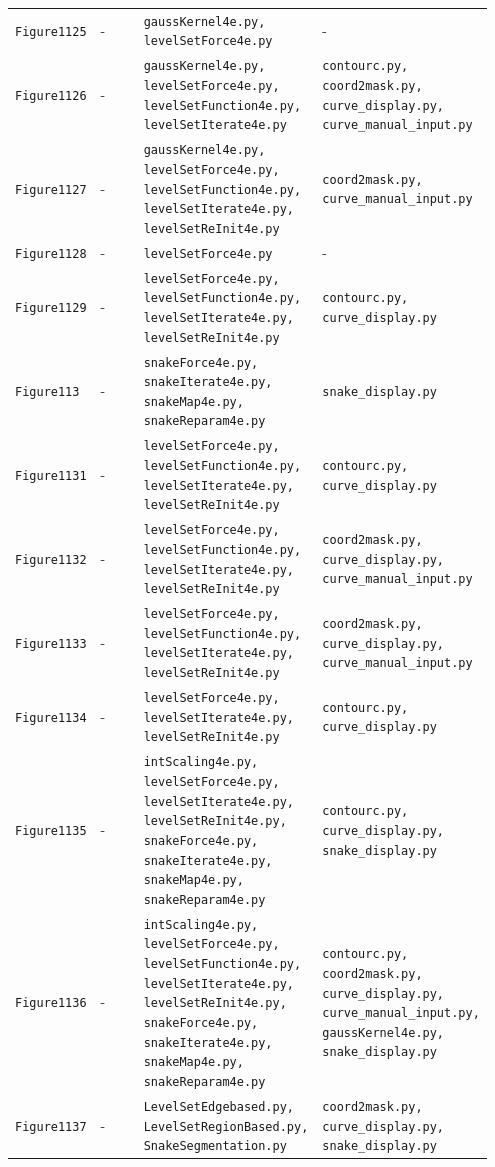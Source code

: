 \documentclass[10pt]{article}
\begin{document}
\begin{longtable}{p{0.11\linewidth} p{0.28\linewidth} p{0.28\linewidth} p{0.28\linewidth}}
\texttt{Figure1125} & - & \texttt{gaussKernel4e.py, levelSetForce4e.py} & - \\
\texttt{Figure1126} & - & \texttt{gaussKernel4e.py, levelSetForce4e.py, levelSetFunction4e.py, levelSetIterate4e.py} & \texttt{contourc.py, coord2mask.py, curve\_display.py, curve\_manual\_input.py} \\
\texttt{Figure1127} & - & \texttt{gaussKernel4e.py, levelSetForce4e.py, levelSetFunction4e.py, levelSetIterate4e.py, levelSetReInit4e.py} & \texttt{coord2mask.py, curve\_manual\_input.py} \\
\texttt{Figure1128} & - & \texttt{levelSetForce4e.py} & - \\
\texttt{Figure1129} & - & \texttt{levelSetForce4e.py, levelSetFunction4e.py, levelSetIterate4e.py, levelSetReInit4e.py} & \texttt{contourc.py, curve\_display.py} \\
\texttt{Figure113} & - & \texttt{snakeForce4e.py, snakeIterate4e.py, snakeMap4e.py, snakeReparam4e.py} & \texttt{snake\_display.py} \\
\texttt{Figure1131} & - & \texttt{levelSetForce4e.py, levelSetFunction4e.py, levelSetIterate4e.py, levelSetReInit4e.py} & \texttt{contourc.py, curve\_display.py} \\
\texttt{Figure1132} & - & \texttt{levelSetForce4e.py, levelSetFunction4e.py, levelSetIterate4e.py, levelSetReInit4e.py} & \texttt{coord2mask.py, curve\_display.py, curve\_manual\_input.py} \\
\texttt{Figure1133} & - & \texttt{levelSetForce4e.py, levelSetFunction4e.py, levelSetIterate4e.py, levelSetReInit4e.py} & \texttt{coord2mask.py, curve\_display.py, curve\_manual\_input.py} \\
\texttt{Figure1134} & - & \texttt{levelSetForce4e.py, levelSetIterate4e.py, levelSetReInit4e.py} & \texttt{contourc.py, curve\_display.py} \\
\texttt{Figure1135} & - & \texttt{intScaling4e.py, levelSetForce4e.py, levelSetIterate4e.py, levelSetReInit4e.py, snakeForce4e.py, snakeIterate4e.py, snakeMap4e.py, snakeReparam4e.py} & \texttt{contourc.py, curve\_display.py, snake\_display.py} \\
\texttt{Figure1136} & - & \texttt{intScaling4e.py, levelSetForce4e.py, levelSetFunction4e.py, levelSetIterate4e.py, levelSetReInit4e.py, snakeForce4e.py, snakeIterate4e.py, snakeMap4e.py, snakeReparam4e.py} & \texttt{contourc.py, coord2mask.py, curve\_display.py, curve\_manual\_input.py, gaussKernel4e.py, snake\_display.py} \\
\texttt{Figure1137} & - & \texttt{LevelSetEdgebased.py, LevelSetRegionBased.py, SnakeSegmentation.py} & \texttt{coord2mask.py, curve\_display.py, snake\_display.py} \\

\end{longtable}
\end{document}

